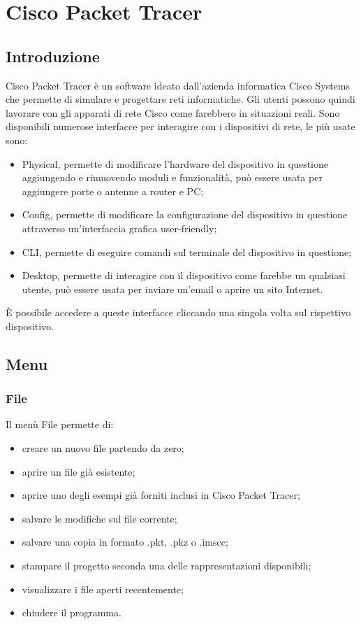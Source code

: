 \section{Cisco Packet Tracer}

\subsection{Introduzione}
Cisco Packet Tracer è un software ideato dall'azienda informatica Cisco Systems che permette di simulare e progettare reti informatiche. Gli utenti possono quindi lavorare con gli apparati di rete Cisco come farebbero in situazioni reali. \newline
Sono disponibili numerose interfacce per interagire con i dispositivi di rete, le più usate sono:
%
\begin{itemize}
    \item Physical, permette di modificare l'hardware del dispositivo in questione aggiungendo e rimuovendo moduli e funzionalità, può essere usata per aggiungere porte o antenne a router e PC;
    \item Config, permette di modificare la configurazione del dispositivo in questione attraverso un'interfaccia grafica user-friendly;
    \item CLI, permette di eseguire comandi sul terminale del dispositivo in questione;
    \item Desktop, permette di interagire con il dispositivo come farebbe un qualsiasi utente, può essere usata per inviare un'email o aprire un sito Internet.
\end{itemize}
%
È possibile accedere a queste interfacce cliccando una singola volta sul rispettivo dispositivo.

\subsection{Menu}

\subsubsection{File}
Il menù File permette di: 

\begin{itemize}
    \item creare un nuovo file partendo da zero;
    \item aprire un file già esistente;
    \item aprire uno degli esempi già forniti inclusi in Cisco Packet Tracer;
    \item salvare le modifiche sul file corrente;
    \item salvare una copia in formato .pkt, .pkz o .imscc;
    \item stampare il progetto seconda una delle rappresentazioni disponibili;
    \item visualizzare i file aperti recentemente;
    \item chiudere il programma.
\end{itemize}

